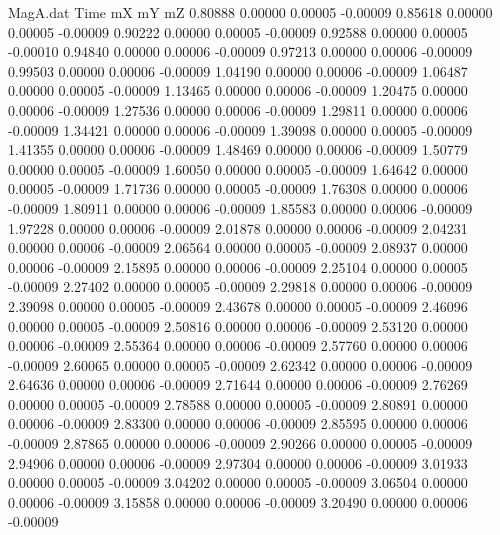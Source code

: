 \begin{filecontents}{MagA.dat}
Time mX mY mZ
   0.80888    0.00000    0.00005   -0.00009
   0.85618    0.00000    0.00005   -0.00009
   0.90222    0.00000    0.00005   -0.00009
   0.92588    0.00000    0.00005   -0.00010
   0.94840    0.00000    0.00006   -0.00009
   0.97213    0.00000    0.00006   -0.00009
   0.99503    0.00000    0.00006   -0.00009
   1.04190    0.00000    0.00006   -0.00009
   1.06487    0.00000    0.00005   -0.00009
   1.13465    0.00000    0.00006   -0.00009
   1.20475    0.00000    0.00006   -0.00009
   1.27536    0.00000    0.00006   -0.00009
   1.29811    0.00000    0.00006   -0.00009
   1.34421    0.00000    0.00006   -0.00009
   1.39098    0.00000    0.00005   -0.00009
   1.41355    0.00000    0.00006   -0.00009
   1.48469    0.00000    0.00006   -0.00009
   1.50779    0.00000    0.00005   -0.00009
   1.60050    0.00000    0.00005   -0.00009
   1.64642    0.00000    0.00005   -0.00009
   1.71736    0.00000    0.00005   -0.00009
   1.76308    0.00000    0.00006   -0.00009
   1.80911    0.00000    0.00006   -0.00009
   1.85583    0.00000    0.00006   -0.00009
   1.97228    0.00000    0.00006   -0.00009
   2.01878    0.00000    0.00006   -0.00009
   2.04231    0.00000    0.00006   -0.00009
   2.06564    0.00000    0.00005   -0.00009
   2.08937    0.00000    0.00006   -0.00009
   2.15895    0.00000    0.00006   -0.00009
   2.25104    0.00000    0.00005   -0.00009
   2.27402    0.00000    0.00005   -0.00009
   2.29818    0.00000    0.00006   -0.00009
   2.39098    0.00000    0.00005   -0.00009
   2.43678    0.00000    0.00005   -0.00009
   2.46096    0.00000    0.00005   -0.00009
   2.50816    0.00000    0.00006   -0.00009
   2.53120    0.00000    0.00006   -0.00009
   2.55364    0.00000    0.00006   -0.00009
   2.57760    0.00000    0.00006   -0.00009
   2.60065    0.00000    0.00005   -0.00009
   2.62342    0.00000    0.00006   -0.00009
   2.64636    0.00000    0.00006   -0.00009
   2.71644    0.00000    0.00006   -0.00009
   2.76269    0.00000    0.00005   -0.00009
   2.78588    0.00000    0.00005   -0.00009
   2.80891    0.00000    0.00006   -0.00009
   2.83300    0.00000    0.00006   -0.00009
   2.85595    0.00000    0.00006   -0.00009
   2.87865    0.00000    0.00006   -0.00009
   2.90266    0.00000    0.00005   -0.00009
   2.94906    0.00000    0.00006   -0.00009
   2.97304    0.00000    0.00006   -0.00009
   3.01933    0.00000    0.00005   -0.00009
   3.04202    0.00000    0.00005   -0.00009
   3.06504    0.00000    0.00006   -0.00009
   3.15858    0.00000    0.00006   -0.00009
   3.20490    0.00000    0.00006   -0.00009

\end{filecontents}
